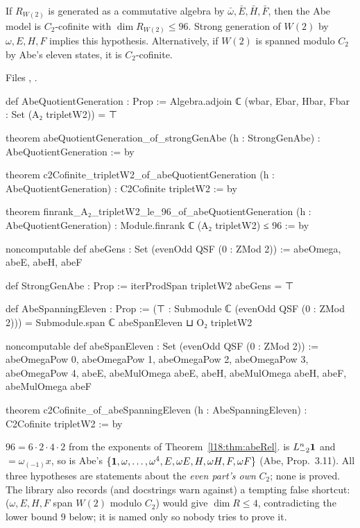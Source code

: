\begin{theorem}\label{l18:thm:abeC2}
If $R_{W(2)}$ is generated as a commutative algebra by $\bar\omega,\bar E,\bar H,\bar F$, then the Abe model is
$C_2$-cofinite with $\dim R_{W(2)}\le96$. Strong generation of $W(2)$ by $\omega,E,H,F$ implies this hypothesis.
Alternatively, if $W(2)$ is spanned modulo $C_2$ by Abe's eleven states, it is $C_2$-cofinite.
\end{theorem}
\noindent Files ,
.
\begin{leancode}
def AbeQuotientGeneration : Prop :=
  Algebra.adjoin ℂ ({wbar, Ebar, Hbar, Fbar} : Set (A₂ tripletW2)) = ⊤

theorem abeQuotientGeneration_of_strongGenAbe (h : StrongGenAbe) :
    AbeQuotientGeneration := by

theorem c2Cofinite_tripletW2_of_abeQuotientGeneration
    (h : AbeQuotientGeneration) : C2Cofinite tripletW2 := by

theorem finrank_A₂_tripletW2_le_96_of_abeQuotientGeneration
    (h : AbeQuotientGeneration) : Module.finrank ℂ (A₂ tripletW2) ≤ 96 := by
\end{leancode}
\begin{leancode}
noncomputable def abeGens : Set (evenOdd QSF (0 : ZMod 2)) := {abeOmega, abeE, abeH, abeF}

def StrongGenAbe : Prop := iterProdSpan tripletW2 abeGens = ⊤

def AbeSpanningEleven : Prop :=
  (⊤ : Submodule ℂ (evenOdd QSF (0 : ZMod 2))) = Submodule.span ℂ abeSpanEleven ⊔ O₂ tripletW2

noncomputable def abeSpanEleven : Set (evenOdd QSF (0 : ZMod 2)) :=
  {abeOmegaPow 0, abeOmegaPow 1, abeOmegaPow 2, abeOmegaPow 3, abeOmegaPow 4,
    abeE, abeMulOmega abeE, abeH, abeMulOmega abeH, abeF, abeMulOmega abeF}

theorem c2Cofinite_of_abeSpanningEleven (h : AbeSpanningEleven) : C2Cofinite tripletW2 := by
\end{leancode}
\begin{dictionary}
$96=6\cdot2\cdot4\cdot2$ from the exponents of Theorem~\ref{l18:thm:abeRel}.  is
$L_{-2}^n\mathbf{1}$ and  $=\omega_{(-1)}x$, so  is Abe's
$\{\mathbf{1},\omega,\dots,\omega^4,E,\omega E,H,\omega H,F,\omega F\}$ (Abe, Prop.~3.11). All three
hypotheses are statements about the \emph{even part's own} $C_2$; none is proved. The library also records
(and docstrings warn against) a tempting false shortcut:  ($\omega,E,H,F$ span $W(2)$ modulo
$C_2$) would give $\dim R\le4$, contradicting the lower bound $9$ below; it is named only so nobody tries to
prove it.
\end{dictionary}
